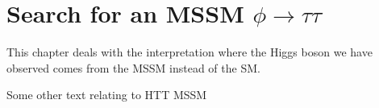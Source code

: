 \chapter{Search for an MSSM $\phi \rightarrow\tau\tau$}
\label{chap:httmssm}

This chapter deals with the interpretation where the Higgs boson we have
observed comes from the MSSM instead of the SM.

Some other text relating to HTT MSSM

